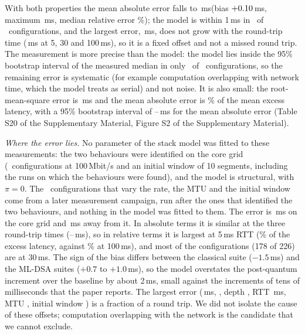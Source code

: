 \documentclass[preprint,12pt]{elsarticle}
\newcommand{\ms}{\,ms\xspace}
\newcommand{\supp}[1]{#1 of the Supplementary Material}
\begin{document}
With both properties the mean absolute error falls to \tbMaeStack\ms (bias $+0.10$\ms, maximum \tbMaxStack\ms, median relative error \tbRelStack\%); the model is within 1\ms in \tbWithinOne\ of \tbNConfigs\ configurations, and the largest error, \tbMaxStack\ms, does not grow with the round-trip time (\tbMaxStackRtt\ms at 5, 30 and 100\ms), so it is a fixed offset and not a missed round trip. The measurement is more precise than the model: the model lies inside the 95\% bootstrap interval of the measured median in only \tbInCi\ of \tbNConfigs\ configurations, so the remaining error is systematic (for example computation overlapping with network time, which the model treats as serial) and not noise. It is also small: the root-mean-square error is \resRmse\ms and the mean absolute error is \resNmae\% of the mean excess latency, with a 95\% bootstrap interval of \resMaeLo--\resMaeHi\ms for the mean absolute error (\supp{Table S20}, \supp{Figure S2}).\par\emph{Where the error lies.} No parameter of the stack model was fitted to these measurements: the two behaviours were identified on the core grid (\resCoreN\ configurations at 100\,Mbit/s and an initial window of 10 segments, including the runs on which the behaviours were found), and the model is structural, with $\pi=0$. The \resAwayN\ configurations that vary the rate, the MTU and the initial window come from a later measurement campaign, run after the ones that identified the two behaviours, and nothing in the model was fitted to them. The error is \resCoreMae\ms on the core grid and \resAwayMae\ms away from it. In absolute terms it is similar at the three round-trip times (\resMaeRttLo--\resMaeRttHi\ms), so in relative terms it is largest at 5\ms RTT (\resNmaeRttHi\% of the excess latency, against \resNmaeRttLo\% at 100\ms), and most of the configurations (178 of 226) are at 30\ms. The sign of the bias differs between the classical suite ($-1.5$\ms) and the ML-DSA suites ($+0.7$ to $+1.0$\ms), so the model overstates the post-quantum increment over the baseline by about 2\ms, small against the increments of tens of milliseconds that the paper reports. The largest error (\resWorstErr\ms, \resWorstSuite, depth \resWorstDepth, RTT \resWorstRtt\ms, MTU \resWorstMtu, initial window \resWorstIcw) is a fraction of a round trip. We did not isolate the cause of these offsets; computation overlapping with the network is the candidate that we cannot exclude.
\end{document}
